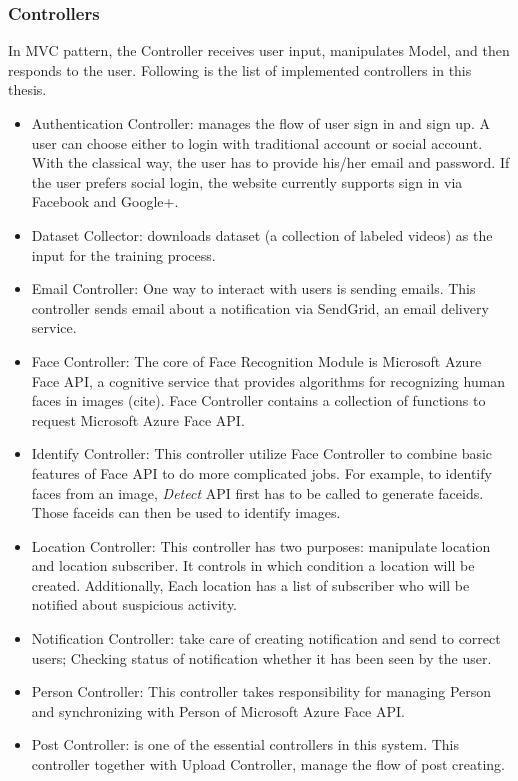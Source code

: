 \subsubsection{Controllers}
In MVC pattern, the Controller receives user input, manipulates Model, and then responds to the user. Following is the list of implemented controllers in this thesis.
\begin{itemize}
	\item Authentication Controller: manages the flow of user sign in and sign up. A user can choose either to login with traditional account or social account. With the classical way, the user has to provide his/her email and password. If the user prefers social login, the website currently supports sign in via Facebook and Google+.
	\item Dataset Collector: downloads dataset (a collection of labeled videos) as the input for the training process.
	\item Email Controller: One way to interact with users is sending emails. This controller sends email about a notification via SendGrid, an email delivery service.
	\item Face Controller: The core of Face Recognition Module is Microsoft Azure Face API, a cognitive service that provides algorithms for recognizing human faces in images (cite). Face Controller contains a collection of functions to request Microsoft Azure Face API.
	\item Identify Controller: This controller utilize Face Controller to combine basic features of Face API to do more complicated jobs. For example, to identify faces from an image, \textit{Detect} API first has to be called to generate faceids. Those faceids can then be used to identify images.
	\item Location Controller: This controller has two purposes: manipulate location and location subscriber. It controls in which condition a location will be created. Additionally, Each location has a list of subscriber who  will be notified about suspicious activity.
	\item Notification Controller:  take care of creating notification and send to correct users; Checking status of notification whether it has been seen by the user.
	\item Person Controller: This controller takes responsibility for managing Person and synchronizing with Person of Microsoft Azure Face API.
	\item Post Controller: is one of the essential controllers in this system. This controller together with Upload Controller, manage the flow of post creating.

\end{itemize}
